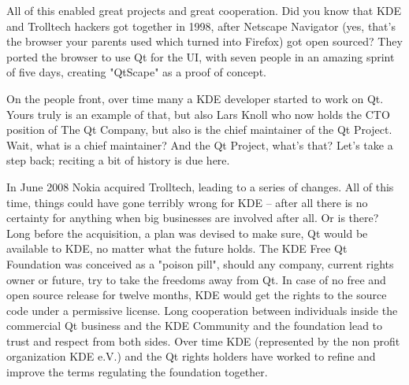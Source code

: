 All of this enabled great projects and great cooperation. Did you know that KDE
and Trolltech hackers got together in 1998, after Netscape Navigator (yes,
that’s the browser your parents used which turned into Firefox) got open
sourced? They ported the browser to use Qt for the UI, with seven people in an
amazing sprint of five days, creating "QtScape" as a proof of concept.

On the people front, over time many a KDE developer started to work on Qt. Yours
truly is an example of that, but also Lars Knoll who now holds the CTO position
of The Qt Company, but also is the chief maintainer of the Qt Project. Wait,
what is a chief maintainer? And the Qt Project, what’s that? Let’s take a
step back; reciting a bit of history is due here.

In June 2008 Nokia acquired Trolltech, leading to a series of changes. All of
this time, things could have gone terribly wrong for KDE – after all there is no
certainty for anything when big businesses are involved after all. Or is there?
Long before the acquisition, a plan was devised to make sure, Qt would be
available to KDE, no matter what the future holds. The KDE Free Qt Foundation
was conceived as a "poison pill", should any company, current rights owner or
future, try to take the freedoms away from Qt. In case of no free and open
source release for twelve months, KDE would get the rights to the source code
under a permissive license. Long cooperation between individuals inside the
commercial Qt business and the KDE Community and the foundation lead to trust
and respect from both sides. Over time KDE (represented by the non profit
        organization KDE e.V.) and the Qt rights holders have worked to refine
and improve the terms regulating the foundation together.


